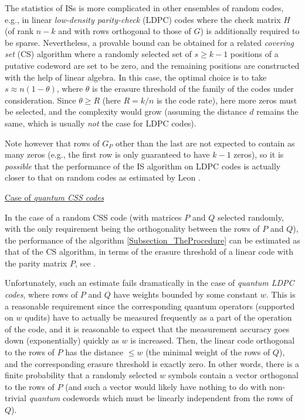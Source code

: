 \documentclass[a4paper,11pt]{report}
\begin{document}
{{{ The statistics of ISs is more complicated in other ensembles of random codes,
e.g., in linear \emph{low-density parity-check} (LDPC) codes where the check matrix $H$ (of rank $n-k$ and with rows orthogonal to those of $G$) is additionally required to be sparse. Nevertheless, a provable bound can be
obtained for a related \emph{covering set} (CS) algorithm where a randomly selected set of $s\ge k-1$ positions of a putative codeword are set to be zero, and the remaining
positions are constructed with the help of linear algebra. In this case, the
optimal choice \cite{Dumer-Kovalev-Pryadko-IEEE-2017} is to take $s\approx n(1-\theta)$, where $\theta $ is the erasure threshold of the family of the codes under consideration. Since $\theta\ge R$ (here $R=k/n$ is the code rate), here more zeros must be selected, and the complexity would
grow (assuming the distance $d$ remains the same, which is usually \emph{not} the case for LDPC codes). 

 Note however that rows of $G_P$ other than the last are not expected to contain as many zeros (e.g., the first
row is only guaranteed to have $k-1$ zeros), so it is \emph{possible} that the performance of the IS algorithm on LDPC codes is actually closer to
that on random codes as estimated by Leon \cite{Leon-1988}. 

 
\medskip\noindent\underline{%
 Case of \emph{quantum CSS codes} 
}
 

 In the case of a random CSS code (with matrices $P$ and $Q$ selected randomly, with the only requirement being the orthogonality between
the rows of $P$ and $Q$), the performance of the algorithm \ref{Subsection_TheProcedure} can be estimated as that of the CS algorithm, in terms of the erasure
threshold of a linear code with the parity matrix $P$, see \cite{Dumer-Kovalev-Pryadko-IEEE-2017}. 

 Unfortunately, such an estimate fails dramatically in the case of \emph{quantum LDPC codes}, where rows of $P$ and $Q$ have weights bounded by some constant $w$. This is a reasonable requirement since the corresponding quantum operators
(supported on $w$ qudits) have to actually be measured frequently as a part of the operation of
the code, and it is reasonable to expect that the measurement accuracy goes
down (exponentially) quickly as $w$ is increased. Then, the linear code orthogonal to the rows of $P$ has the distance $\le w$ (the minimal weight of the rows of $Q$), and the corresponding erasure threshold is exactly zero. In other words,
there is a finite probability that a randomly selected $w$ symbols contain a vector orthogonal to the rows of $P$ (and such a vector would likely have nothing to do with non-trivial \emph{quantum} codewords which must be linearly independent from the rows of $Q$). 

}}}
\end{document}
